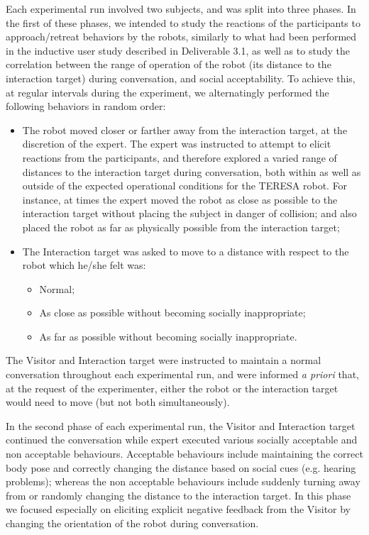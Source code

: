 \documentclass[a4paper,11pt]{report}
\begin{document}
Each experimental run involved two subjects, and was split into three phases. In the first of these phases, we intended to study the reactions of the participants to approach/retreat behaviors by the robots, similarly to what had been performed in the inductive user study described in Deliverable 3.1, as well as to study the correlation between the range of operation of the robot (its distance to the interaction target) during conversation, and social acceptability. To achieve this, at regular intervals during the experiment, we alternatingly performed the following behaviors in random order:
\begin{itemize}
\item The robot moved closer or farther away from the interaction target, at the discretion of the expert. The expert was instructed to attempt to elicit reactions from the participants, and therefore explored a varied range of distances to the interaction target during conversation, both within as well as outside of the expected operational conditions for the TERESA robot. For instance, at times the expert moved the robot as close as possible to the interaction target without placing the subject in danger of collision; and also placed the robot as far as physically possible from the interaction target;
\item The Interaction target was asked to move to a distance with respect to the robot which he/she felt was:
  \begin{itemize}
  \item Normal;
  \item As close as possible without becoming socially inappropriate;
  \item As far as possible without becoming socially inappropriate.
  \end{itemize}
\end{itemize}

The Visitor and Interaction target were instructed to maintain a normal conversation throughout each experimental run, and were informed \emph{a priori} that, at the request of the experimenter, either the robot or the interaction target would need to move (but not both simultaneously).

In the second phase of each experimental run, the Visitor and Interaction target continued the conversation while expert executed various socially acceptable and non acceptable behaviours. Acceptable behaviours include maintaining the correct body pose and correctly changing the distance based on social cues (e.g. hearing problems); whereas the non acceptable behaviours include suddenly turning away from or randomly changing the distance to the interaction target. In this phase we focused especially on eliciting explicit negative feedback from the Visitor by changing the orientation of the robot during conversation.
\end{document}

